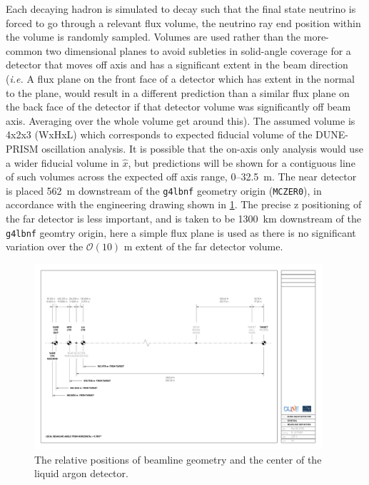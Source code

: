 \documentclass{article}
\begin{document}
Each decaying hadron is simulated to decay such that the final state neutrino is forced to go through a relevant flux volume, the neutrino ray end position within the volume is randomly sampled. Volumes are used rather than the more-common two dimensional planes to avoid subleties in solid-angle coverage for a detector that moves off axis and has a significant extent in the beam direction (\emph{i.e.} A flux plane on the front face of a detector which has extent in the normal to the plane, would result in a different prediction than a similar flux plane on the back face of the detector if that detector volume was significantly off beam axis. Averaging over the whole volume get around this). The assumed volume is 4x2x3 (WxHxL) which corresponds to expected fiducial volume of the DUNE-PRISM oscillation analysis. It is possible that the on-axis only analysis would use a wider fiducial volume in $\hat{x}$, but predictions will be shown for a contiguous line of such volumes across the expected off axis range, 0--32.5~m. The near detector is placed 562~m downstream of the \texttt{g4lbnf} geometry origin (\texttt{MCZER0}), in accordance with the engineering drawing shown in \ref{fig:flux_predictions__NDHallDef}. The precise z positioning of the far detector is less important, and is taken to be 1300~km downstream of the \texttt{g4lbnf} geomtry origin, here a simple flux plane is used as there is no significant variation over the $\mathcal{O}(10)$ m extent of the far detector volume.

\begin{figure}
  \centering
  \includegraphics[width=0.95\textwidth]{plots/BEAMLINEDEFINITION}
  \caption{The relative positions of beamline geometry and the center of the liquid argon detector.}
  \label{fig:flux_predictions__NDHallDef}
\end{figure}
\end{document}
